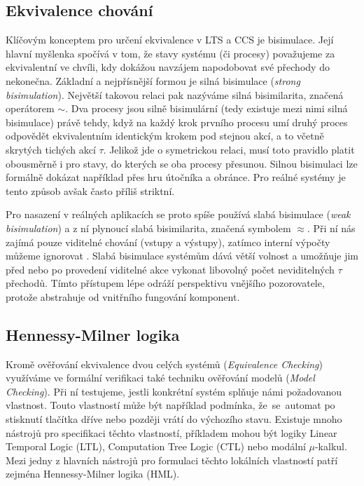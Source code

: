 \subsection{Ekvivalence chování}
\label{sec:equivalence}
Klíčovým konceptem pro určení ekvivalence v LTS a CCS je bisimulace.
Její hlavní myšlenka spočívá v tom, že stavy systému (či procesy) považujeme za ekvivalentní ve chvíli, kdy dokážou navzájem napodobovat své přechody do nekonečna.
Základní a nejpřísnější formou je silná bisimulace (\textit{strong bisimulation}). Největší takovou relaci pak nazýváme silná bisimilarita, značená operátorem $\sim$. 
Dva procesy jsou silně bisimulární (tedy existuje mezi nimi silná bisimulace) právě tehdy, když na každý krok prvního procesu umí druhý proces odpovědět ekvivalentním identickým krokem pod stejnou akcí, a to včetně skrytých tichých akcí $\tau$. 
Jelikož jde o symetrickou relaci, musí toto pravidlo platit obousměrně i pro stavy, do kterých se oba procesy přesunou.
Silnou bisimulaci lze formálně dokázat například přes hru útočníka a obránce. Pro reálné systémy je tento způsob avšak často příliš striktní. 

Pro nasazení v reálných aplikacích se proto spíše používá slabá bisimulace (\textit{weak bisimulation}) a z ní plynoucí slabá bisimilarita, značená symbolem $\approx$. 
Při ní nás zajímá pouze viditelné chování (vstupy a výstupy), zatímco interní výpočty můžeme ignorovat \cite{aceto2007reactive}. 
Slabá bisimulace systémům dává větší volnost a umožňuje jim před nebo po provedení viditelné akce vykonat libovolný počet neviditelných $\tau$ přechodů. 
Tímto přístupem lépe odráží perspektivu vnějšího pozorovatele, protože abstrahuje od vnitřního fungování komponent.

\subsection{Hennessy-Milner logika}
Kromě ověřování ekvivalence dvou celých systémů (\textit{Equivalence Checking}) využíváme ve formální verifikaci také techniku ověřování modelů (\textit{Model Checking}). 
Při ní testujeme, jestli konkrétní systém splňuje námi požadovanou vlastnost.
Touto vlastností může být například podmínka, že~se~automat po stisknutí tlačítka dříve nebo později vrátí do výchozího stavu.
Existuje mnoho nástrojů pro specifikaci těchto vlastností, příkladem mohou být logiky Linear Temporal Logic (LTL), Computation Tree Logic (CTL) nebo modální $\mu$-kalkul.
Mezi jedny z hlavních nástrojů pro formulaci těchto lokálních vlastností patří zejména Hennessy-Milner logika (HML).

